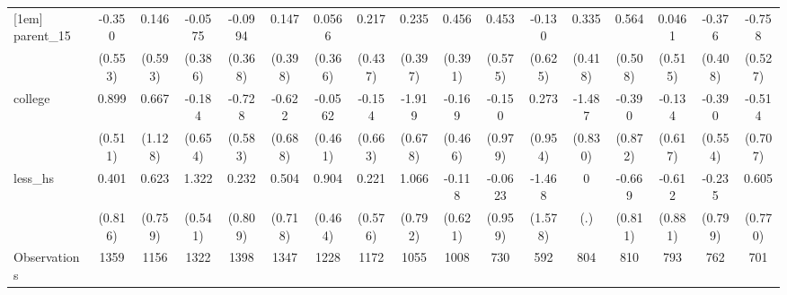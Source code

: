 {\begin{tabular}{l*{16}{c}}
[1em]
parent\_15           &      -0.350         &       0.146         &     -0.0575         &     -0.0994         &       0.147         &      0.0566         &       0.217         &       0.235         &       0.456         &       0.453         &      -0.130         &       0.335         &       0.564         &      0.0461         &      -0.376         &      -0.758         \\
                    &     (0.553)         &     (0.593)         &     (0.386)         &     (0.368)         &     (0.398)         &     (0.366)         &     (0.437)         &     (0.397)         &     (0.391)         &     (0.575)         &     (0.625)         &     (0.418)         &     (0.508)         &     (0.515)         &     (0.408)         &     (0.527)         \\
[1em]
college             &       0.899         &       0.667         &      -0.184         &      -0.728         &      -0.622         &     -0.0562         &      -0.154         &      -1.919\sym{**} &      -0.169         &      -0.150         &       0.273         &      -1.487         &      -0.390         &      -0.134         &      -0.390         &      -0.514         \\
                    &     (0.511)         &     (1.128)         &     (0.654)         &     (0.583)         &     (0.688)         &     (0.461)         &     (0.663)         &     (0.678)         &     (0.466)         &     (0.979)         &     (0.954)         &     (0.830)         &     (0.872)         &     (0.617)         &     (0.554)         &     (0.707)         \\
[1em]
less\_hs             &       0.401         &       0.623         &       1.322\sym{*}  &       0.232         &       0.504         &       0.904         &       0.221         &       1.066         &      -0.118         &     -0.0623         &      -1.468         &           0         &      -0.669         &      -0.612         &      -0.235         &       0.605         \\
                    &     (0.816)         &     (0.759)         &     (0.541)         &     (0.809)         &     (0.718)         &     (0.464)         &     (0.576)         &     (0.792)         &     (0.621)         &     (0.959)         &     (1.578)         &         (.)         &     (0.811)         &     (0.881)         &     (0.799)         &     (0.770)         \\
\hline
Observations        &        1359         &        1156         &        1322         &        1398         &        1347         &        1228         &        1172         &        1055         &        1008         &         730         &         592         &         804         &         810         &         793         &         762         &         701         \\

\end{tabular}}
